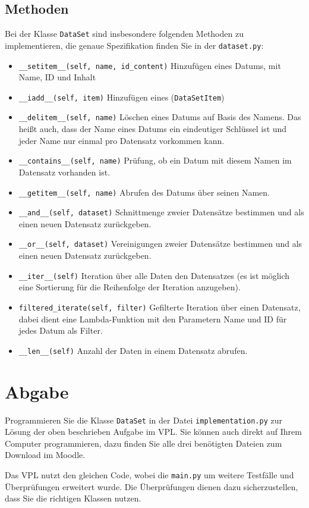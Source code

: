 \documentclass[
    12pt, %
    a4paper, %
    parskip=full %
]{scrartcl}
\begin{document}
\subsection{Methoden}
Bei der Klasse \texttt{DataSet} sind insbesondere folgenden Methoden zu implementieren, die genaue Spezifikation finden Sie in der \texttt{dataset.py}:
\begin{itemize}
    \fontsize{11}{13}
    \setlength{\itemsep}{1pt}
    \setlength{\parskip}{1pt}
    \setlength{\parsep}{1pt}
    \item \texttt{\_\_setitem\_\_(self, name, id\_content)} Hinzufügen eines Datums, mit Name, ID und Inhalt
    \item \texttt{\_\_iadd\_\_(self, item)} Hinzufügen eines (\texttt{DataSetItem})
    \item \texttt{\_\_delitem\_\_(self, name)} Löschen eines Datums auf Basis des Namens. Das heißt auch, dass der Name eines Datums ein eindeutiger Schlüssel ist und jeder Name nur einmal pro Datensatz vorkommen kann.
    \item \texttt{\_\_contains\_\_(self, name)} Prüfung, ob ein Datum mit diesem Namen im Datensatz vorhanden ist.
    \item \texttt{\_\_getitem\_\_(self, name)} Abrufen des Datums über seinen Namen.
    \item \texttt{\_\_and\_\_(self, dataset)} Schnittmenge zweier Datensätze bestimmen und als einen neuen Datensatz zurückgeben.
    \item \texttt{\_\_or\_\_(self, dataset)} Vereinigungen zweier Datensätze bestimmen und als einen neuen Datensatz zurückgeben.
    \item \texttt{\_\_iter\_\_(self)} Iteration über alle Daten den Datensatzes (es ist möglich eine Sortierung für die Reihenfolge der Iteration anzugeben).
    \item \texttt{filtered\_iterate(self, filter)} Gefilterte Iteration über einen Datensatz, dabei dient eine Lambda-Funktion mit den Parametern Name und ID für jedes Datum als Filter.
    \item \texttt{\_\_len\_\_(self)} Anzahl der Daten in einem Datensatz abrufen.
\end{itemize}

\section{Abgabe}

Programmieren Sie die Klasse \texttt{DataSet} in der Datei \texttt{implementation.py} zur Lösung der oben beschrieben Aufgabe im VPL.
Sie können auch direkt auf Ihrem Computer programmieren, dazu finden Sie alle drei benötigten Dateien zum Download im Moodle.

Das VPL nutzt den gleichen Code, wobei die \texttt{main.py} um weitere Testfälle und Überprüfungen erweitert wurde.
Die Überprüfungen dienen dazu sicherzustellen, dass Sie die richtigen Klassen nutzen.
\end{document}
